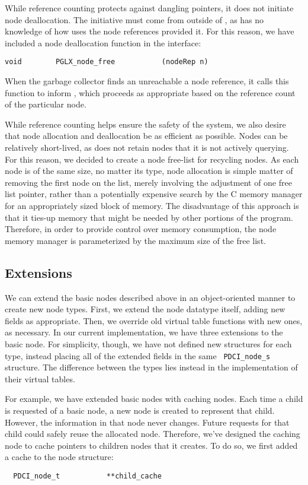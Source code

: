 \documentclass{article}
\begin{document}
While reference counting protects against dangling pointers, it does
not initiate node deallocation.  The initiative must come from outside
of \pads, as \pads has no knowledge of how \galax uses the node
references provided it. For this reason, we have included a node
deallocation function in the \pglx interface:
\begin{verbatim}
void        PGLX_node_free           (nodeRep n)
\end{verbatim}
When the \galax garbage collector finds an unreachable a node reference,
it calls this function to inform \pads, which proceeds as appropriate
based on the reference count of the particular node.

While reference counting helps ensure the safety of the system, we
also desire that node allocation and deallocation be as efficient as
possible.  Nodes can be relatively short-lived, as \galax does not
retain nodes that it is not actively querying. For this reason, we
decided to create a node free-list for recycling nodes. As each node
is of the same size, no matter its type, node allocation is simple
matter of removing the first node on the list, merely involving the
adjustment of one free list pointer, rather than a potentially
expensive search by the C memory manager for an appropriately sized
block of memory. The disadvantage of this approach is that it ties-up
memory that might be needed by other portions of the program.
Therefore, in order to provide control over memory consumption, the
node memory manager is parameterized by the maximum size of the free
list.

\subsection{Extensions}
\label{sec:node-ext}

We can extend the basic nodes described above in an object-oriented
manner to create new node types.  First, we extend the node datatype
itself, adding new fields as appropriate.  Then, we override old
virtual table functions with new ones, as necessary. In our current
implementation, we have three extensions to the basic node. For
simplicity, though, we have not defined new structures for each type,
instead placing all of the extended fields in the same {\tt
  PDCI\_node\_s} structure. The difference between the types lies
instead in the implementation of their virtual tables.

For example, we have extended basic nodes with caching nodes. Each
time a child is requested of a basic node, a new node is created to
represent that child. However, the information in that node never
changes. Future requests for that child could safely reuse the
allocated node. Therefore, we've designed the caching node to cache
pointers to children nodes that it creates.  To do so, we first added
a cache to the node structure:
\begin{verbatim}
  PDCI_node_t           **child_cache 
\end{verbatim}
\end{document}
